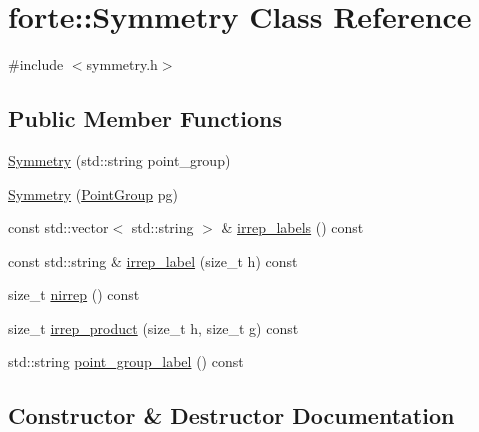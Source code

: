 \hypertarget{classforte_1_1_symmetry}{}\section{forte\+:\+:Symmetry Class Reference}
\label{classforte_1_1_symmetry}


{\ttfamily \#include $<$symmetry.\+h$>$}

\subsection*{Public Member Functions}
\begin{DoxyCompactItemize}
\item 
\mbox{\hyperlink{classforte_1_1_symmetry_a81d689bc914d61831c9c7f76801b9b08}{Symmetry}} (std\+::string point\+\_\+group)
\item 
\mbox{\hyperlink{classforte_1_1_symmetry_ae528a46cac76ca626cbcf5d7f9dd190d}{Symmetry}} (\mbox{\hyperlink{namespaceforte_abe00ec86d0015c0f2b6ac298c6e428e4}{Point\+Group}} pg)
\item 
const std\+::vector$<$ std\+::string $>$ \& \mbox{\hyperlink{classforte_1_1_symmetry_a60cfa20b5fbb79471a58ede1c1a4ccac}{irrep\+\_\+labels}} () const
\item 
const std\+::string \& \mbox{\hyperlink{classforte_1_1_symmetry_a01957f8d6b5bb407041a44caee513795}{irrep\+\_\+label}} (size\+\_\+t h) const
\item 
size\+\_\+t \mbox{\hyperlink{classforte_1_1_symmetry_ae46b78563c548b1668c49bd582fdcf5a}{nirrep}} () const
\item 
size\+\_\+t \mbox{\hyperlink{classforte_1_1_symmetry_a79a7ae2bc89f96b54ed1b9217dd51c0a}{irrep\+\_\+product}} (size\+\_\+t h, size\+\_\+t g) const
\item 
std\+::string \mbox{\hyperlink{classforte_1_1_symmetry_ab9c2019b0541fdd302d017a3bf7c8b81}{point\+\_\+group\+\_\+label}} () const
\end{DoxyCompactItemize}


\subsection{Constructor \& Destructor Documentation}
\mbox{\label{classforte_1_1_symmetry_a81d689bc914d61831c9c7f76801b9b08}} 
